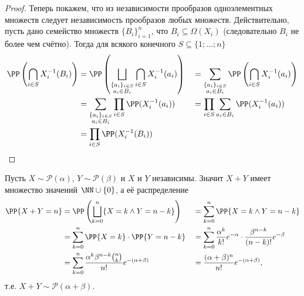 \documentclass[12pt,a4paper]{article}
\begin{document}
\begin{proof}
        Теперь покажем, что из независимости прообразов одноэлементных множеств следует независимость прообразов любых множеств. Действительно, пусть дано семейство множеств $\{B_i\}_{i = 1}^n$, что $B_i \subseteq \Omega(X_i)$ (следовательно $B_i$ не более чем счётно). Тогда для всякого конечного $S \subseteq \{1; \dots; n\}$
        \begin{align*}
            \PP\left(\bigcap_{i \in S} X_i^{-1}(B_i)\right)
            &= \PP\left(\bigsqcup_{\substack{\{a_i\}_{i \in S}\\ a_i \in B_i}} \bigcap_{i \in S} X_i^{-1}(a_i)\right)&
            &= \sum_{\substack{\{a_i\}_{i \in S}\\ a_i \in B_i}} \PP\left(\bigcap_{i \in S} X_i^{-1}(a_i)\right)\\
            &= \sum_{\substack{\{a_i\}_{i \in S}\\ a_i \in B_i}} \prod_{i \in S} \PP(X_i^{-1}(a_i))&
            &= \prod_{i \in S} \sum_{a_i \in B_i} \PP(X_i^{-1}(a_i))\\
            &= \prod_{i \in S} \PP(X_i^{-1}(B_i))
        \end{align*}
    \end{proof}

    \begin{example}
        Пусть $X \sim \mathcal{P}(\alpha)$, $Y \sim \mathcal{P}(\beta)$ и $X$ и $Y$ независимы. Значит $X + Y$ имеет множество значений $\NN \cup \{0\}$, а её распределение
        \begin{align*}
            \PP\{X + Y = n\}
            &= \PP\left(\bigsqcup_{k=0}^n \{X = k \wedge Y = n-k\}\right)&
            &= \sum_{k=0}^n \PP\{X = k \wedge Y = n-k\}\\
            &= \sum_{k=0}^n \PP\{X = k\} \cdot \PP\{Y = n-k\}&
            &= \sum_{k=0}^n \frac{\alpha^k}{k!} e^{-\alpha} \cdot \frac{\beta^{n-k}}{(n-k)!} e^{-\beta}\\
            &= \sum_{k=0}^n \frac{\alpha^k \beta^{n-k} \binom{n}{k}}{n!} e^{-(\alpha + \beta)}&
            &= \frac{(\alpha + \beta)^n}{n!} e^{-(\alpha + \beta)},
        \end{align*}
        т.е. $X + Y \sim \mathcal{P}(\alpha + \beta)$.
    \end{example}
\end{document}
